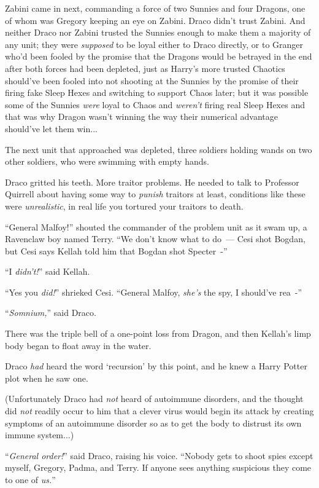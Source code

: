 Zabini came in next, commanding a force of two Sunnies and four Dragons, one of whom was Gregory keeping an eye on Zabini. Draco didn't trust Zabini. And neither Draco nor Zabini trusted the Sunnies enough to make them a majority of any unit; they were \emph{supposed} to be loyal either to Draco directly, or to Granger who'd been fooled by the promise that the Dragons would be betrayed in the end after both forces had been depleted, just as Harry's more trusted Chaotics should've been fooled into not shooting at the Sunnies by the promise of their firing fake Sleep Hexes and switching to support Chaos later; but it was possible some of the Sunnies \emph{were} loyal to Chaos and \emph{weren't} firing real Sleep Hexes and that was why Dragon wasn't winning the way their numerical advantage should've let them win...

The next unit that approached was depleted, three soldiers holding wands on two other soldiers, who were swimming with empty hands.

Draco gritted his teeth. More traitor problems. He needed to talk to Professor Quirrell about having some way to \emph{punish} traitors at least, conditions like these were \emph{unrealistic}, in real life you tortured your traitors to death.

``General Malfoy!'' shouted the commander of the problem unit as it swam up, a Ravenclaw boy named Terry. ``We don't know what to do~--- Cesi shot Bogdan, but Cesi says Kellah told him that Bogdan shot Specter~-''

``I \emph{didn't!}'' said Kellah.

``Yes you \emph{did!}'' shrieked Cesi. ``General Malfoy, \emph{she's} the spy, I should've rea~-''

``\emph{Somnium,}'' said Draco.

There was the triple bell of a one-point loss from Dragon, and then Kellah's limp body began to float away in the water.

Draco \emph{had} heard the word `recursion' by this point, and he knew a Harry Potter plot when he saw one.

(Unfortunately Draco had \emph{not} heard of autoimmune disorders, and the thought did \emph{not} readily occur to him that a clever virus would begin its attack by creating symptoms of an autoimmune disorder so as to get the body to distrust its own immune system...)

``\emph{General order!}'' said Draco, raising his voice. ``Nobody gets to shoot spies except myself, Gregory, Padma, and Terry. If anyone sees anything suspicious they come to one of \emph{us.}''

